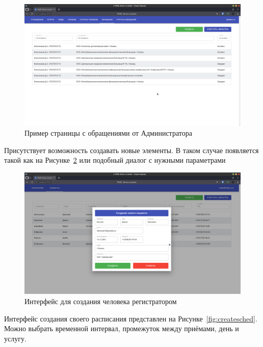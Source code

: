 \documentclass[a4paper,article]{article}
\begin{document}
\begin{sloppypar}
    \begin{figure}[h]
        \centering
        \includegraphics[width=0.8\linewidth]{UI. Обращения от ADMIN.png}        
        \caption{\centering Пример страницы с обращениями от Администратора}        
        \label{fig:uiappointment}        
    \end{figure}
    
    \newpage
    
    Присутствует возможность создавать новые элементы. В таком случае появляется такой как на Рисунке~\ref{fig:uiadd} или подобный диалог с нужными параметрами
    
    \begin{figure}[h]
        \centering
        \includegraphics[width=0.8\linewidth]{UI. Создание человека.png}        
        \caption{\centering Интерфейс для создания человека регистратором}        
        \label{fig:uiadd}        
    \end{figure}
    
    Интерфейс создания своего расписания представлен на Рисунке~\ref{fig:createsched}. Можно выбрать временной интервал, промежуток между приёмами, день и услугу.
    

\end{sloppypar}
\end{document}
